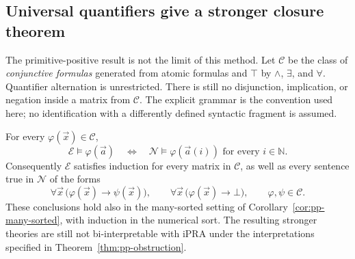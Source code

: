 \subsection{Universal quantifiers give a stronger closure theorem}

The primitive-positive result is not the limit of this method.  Let
$\mathcal C$ be the class of \emph{conjunctive formulas} generated from
atomic formulas and $\top$ by $\wedge$, $\exists$, and $\forall$.
Quantifier alternation is unrestricted.  There is still no disjunction,
implication, or negation inside a matrix from $\mathcal C$.
The explicit grammar is the convention used here; no identification
with a differently defined syntactic fragment is assumed.

\begin{theorem}
\label{thm:conjunctive-induction}
For every $\varphi(\vec x)\in\mathcal C$,
\[
 \mathcal E\models\varphi(\vec a)
 \quad\Longleftrightarrow\quad
 \mathcal N\models\varphi(\vec a(i))
                  \text{ for every }i\in\mathbb N.
\]
Consequently $\mathcal E$ satisfies induction for every matrix in
$\mathcal C$, as well as every sentence true in $\mathcal N$ of the
forms
\[
 \forall\vec x\,\bigl(\varphi(\vec x)\to\psi(\vec x)\bigr),
 \qquad
 \forall\vec x\,\bigl(\varphi(\vec x)\to\bot\bigr),
 \qquad \varphi,\psi\in\mathcal C.
\]
These conclusions hold also in the many-sorted setting of
Corollary~\ref{cor:pp-many-sorted}, with induction in the numerical
sort.  The resulting stronger theories are still not bi-interpretable
with iPRA under the interpretations specified in
Theorem~\ref{thm:pp-obstruction}.
\end{theorem}
